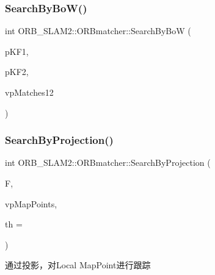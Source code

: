 \subsubsection{\texorpdfstring{Search\+By\+Bo\+W()}{SearchByBoW()}\hspace{0.1cm}{\footnotesize\ttfamily [2/2]}}
{\footnotesize\ttfamily int O\+R\+B\+\_\+\+S\+L\+A\+M2\+::\+O\+R\+Bmatcher\+::\+Search\+By\+BoW (\begin{DoxyParamCaption}\item[{\mbox{\hyperlink{class_o_r_b___s_l_a_m2_1_1_key_frame}{Key\+Frame}} $\ast$}]{p\+K\+F1,  }\item[{\mbox{\hyperlink{class_o_r_b___s_l_a_m2_1_1_key_frame}{Key\+Frame}} $\ast$}]{p\+K\+F2,  }\item[{std\+::vector$<$ \mbox{\hyperlink{class_o_r_b___s_l_a_m2_1_1_map_point}{Map\+Point}} $\ast$$>$ \&}]{vp\+Matches12 }\end{DoxyParamCaption})}

\mbox{\label{class_o_r_b___s_l_a_m2_1_1_o_r_bmatcher_ae43d042858a3a3ca4238bb4ca519f196}} 
\subsubsection{\texorpdfstring{Search\+By\+Projection()}{SearchByProjection()}\hspace{0.1cm}{\footnotesize\ttfamily [1/4]}}
{\footnotesize\ttfamily int O\+R\+B\+\_\+\+S\+L\+A\+M2\+::\+O\+R\+Bmatcher\+::\+Search\+By\+Projection (\begin{DoxyParamCaption}\item[{\mbox{\hyperlink{class_o_r_b___s_l_a_m2_1_1_frame}{Frame}} \&}]{F,  }\item[{const std\+::vector$<$ \mbox{\hyperlink{class_o_r_b___s_l_a_m2_1_1_map_point}{Map\+Point}} $\ast$$>$ \&}]{vp\+Map\+Points,  }\item[{const float}]{th = {} }\end{DoxyParamCaption})}



通过投影，对\+Local Map\+Point进行跟踪 

